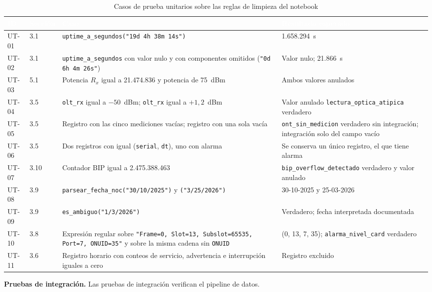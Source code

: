 \documentclass[12pt,a4paper]{article}
\begin{document}
\begin{table}[H]
\centering
\caption{Casos de prueba unitarios sobre las reglas de limpieza del notebook}
\label{tab:unitarias}
\small
\renewcommand{\arraystretch}{1.3}
\begin{tabularx}{\textwidth}{|p{1.15cm}|p{1.2cm}|X|X|}
\hline
\rowcolor{black}
\textcolor{white}{\textbf{ID}} & \textcolor{white}{\textbf{Sección}} & \textcolor{white}{\textbf{Caso}} & \textcolor{white}{\textbf{Resultado esperado}} \\ \hline
UT-01 & 3.1 & \texttt{uptime\_a\_segundos("19d 4h 38m 14s")} & 1.658.294~s \\ \hline
UT-02 & 3.1 & \texttt{uptime\_a\_segundos} con valor nulo y con componentes omitidos (\texttt{"0d 6h 4m 26s"}) & Valor nulo; 21.866~s \\ \hline
UT-03 & 5.1 & Potencia $R_x$ igual a 21.474.836 y potencia de 75~dBm & Ambos valores anulados \\ \hline
UT-04 & 3.5 & \texttt{olt\_rx} igual a $-50$~dBm; \texttt{olt\_rx} igual a $+1{,}2$~dBm & Valor anulado \texttt{lectura\_optica\_atipica} verdadero \\ \hline
UT-05 & 3.5 & Registro con las cinco mediciones vacías; registro con una sola vacía & \texttt{ont\_sin\_medicion} verdadero sin integración; integración solo del campo vacío \\ \hline
UT-06 & 3.5 & Dos registros con igual (\texttt{serial}, \texttt{dt}), uno con alarma & Se conserva un único registro, el que tiene alarma \\ \hline
UT-07 & 3.10 & Contador BIP igual a 2.475.388.463 & \texttt{bip\_overflow\_detectado} verdadero y valor anulado \\ \hline
UT-08 & 3.9 & \texttt{parsear\_fecha\_noc("30/10/2025")} y \texttt{("3/25/2026")} & 30-10-2025 y 25-03-2026 \\ \hline
UT-09 & 3.9 & \texttt{es\_ambiguo("1/3/2026")} & Verdadero; fecha interpretada documentada \\ \hline
UT-10 & 3.8 & Expresión regular sobre \texttt{"Frame=0, Slot=13, Subslot=65535, Port=7, ONUID=35"} y sobre la misma cadena sin \texttt{ONUID} & (0, 13, 7, 35); \texttt{alarma\_nivel\_card} verdadero \\ \hline
UT-11 & 3.6 & Registro horario con conteos de servicio, advertencia e interrupción iguales a cero & Registro excluido \\ \hline
\end{tabularx}
\end{table}
\noindent
\textbf{Pruebas de integración.}
\newline
Las pruebas de integración verifican el pipeline de datos.
\end{document}
